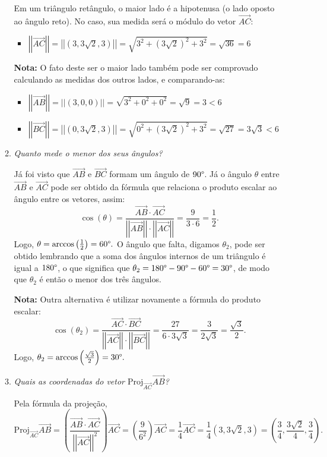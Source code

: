 \documentclass[12pt,a4paper]{article}
\newcommand{\vect}[1]{\overrightarrow{#1}}
\newcommand{\norm}[1]{\left|\left|{#1}\right|\right|}
\begin{document}
\begin{enumerate}
\begin{enumerate}
Em um triângulo retângulo, o maior lado é a hipotenusa (o lado oposto ao ângulo reto). No caso, sua medida será o módulo do vetor $\vect{AC}$:
\begin{itemize}
\item  $\norm{\vect{AC}} = \norm{(3, 3\sqrt{2}, 3)} = \sqrt{3^2 + (3\sqrt{2})^2 + 3^2} = \sqrt{36} = 6$
\end{itemize}
\textbf{Nota:} O fato deste ser o maior lado também pode ser comprovado calculando as medidas dos outros lados, e comparando-as:
\begin{itemize}
\item $\norm{\vect{AB}} = \norm{(3, 0, 0)} = \sqrt{3^2 + 0^2 + 0^2} = \sqrt{9} = 3 < 6$
\item $\norm{\vect{BC}} = \norm{(0, 3\sqrt{2}, 3)} = \sqrt{0^2 + (3\sqrt{2})^2 + 3^2} = \sqrt{27} = 3 \sqrt{3} < 6$
\end{itemize}
\item \textit{Quanto mede o menor dos seus ângulos?}

Já foi visto que $\vect{AB}$ e $\vect{BC}$ formam um ângulo de $90\degree$. Já o ângulo $\theta$ entre $\vect{AB}$ e $\vect{AC}$ pode ser obtido da fórmula que relaciona o produto escalar ao ângulo entre os vetores, assim:
\[
\cos(\theta) = \frac{\vect{AB} \cdot \vect{AC}}
                   {\norm{\vect{AB}} \cdot \norm{\vect{AC}}}
            = \frac{9}{3 \cdot 6}
            = \frac{1}{2}.
\]
Logo, $\theta = \arccos\left( \frac{1}{2} \right) = 60 \degree.$ O ângulo que falta, digamos $\theta_2$, pode ser obtido lembrando que a soma dos ângulos internos de um triângulo é igual a $180\degree$, o que significa que $\theta_2 = 180\degree - 90\degree - 60\degree = 30\degree$, de modo que $\theta_2$ é então o menor dos três ângulos.

\textbf{Nota:} Outra alternativa é utilizar novamente a fórmula do produto escalar:
\[
\cos(\theta_2) = \frac{\vect{AC} \cdot \vect{BC}}
                      {\norm{\vect{AC}} \cdot \norm{\vect{BC}}}
            = \frac{27}{6 \cdot 3 \sqrt{3}}
            = \frac{3}{2\sqrt{3}}
            = \frac{\sqrt{3}}{2}.
\]
Logo, $\theta_2 = \arccos\left( \frac{\sqrt{3}}{2} \right) = 30 \degree.$
\item \textit{Quais as coordenadas do vetor $\text{Proj}_{\vect{AC}}\vect{AB}$?}

Pela fórmula da projeção,
\[
\text{Proj}_{\vect{AC}}\vect{AB}
= \left( \frac{\vect{AB} \cdot \vect{AC}}{ \norm{ \vect{AC} }^2} \right) \vect{AC}
= \left( \frac{9}{ 6^2} \right) \vect{AC}
= \frac{1}{4}\vect{AC}
= \frac{1}{4}\left(3, 3\sqrt{2}, 3\right)
= \left(\frac{3}{4}, \frac{3\sqrt{2}}{4}, \frac{3}{4} \right).
\]


\end{enumerate}
\end{enumerate}
\end{document}

